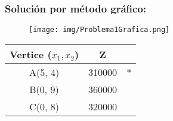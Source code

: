 \documentclass{templateNote}
\begin{document}
\subsubsection*{Solución por método gráfico:}
\begin{figure}[H]
    \centering
    \texttt{[image: img/Problema1Grafica.png]}
\end{figure}
\begin{center}
    \begin{tabular}{|c|c|c|}
        \hline
        \textbf{Vertice ($x_1,x_2$)} & Z &  \\ \hline
        A(5, 4) & 310000 & * \\ \hline
        B(0, 9) & 360000 & \\ \hline
        C(0, 8) & 320000 & \\ \hline
    \end{tabular}
\end{center}


\end{document}
